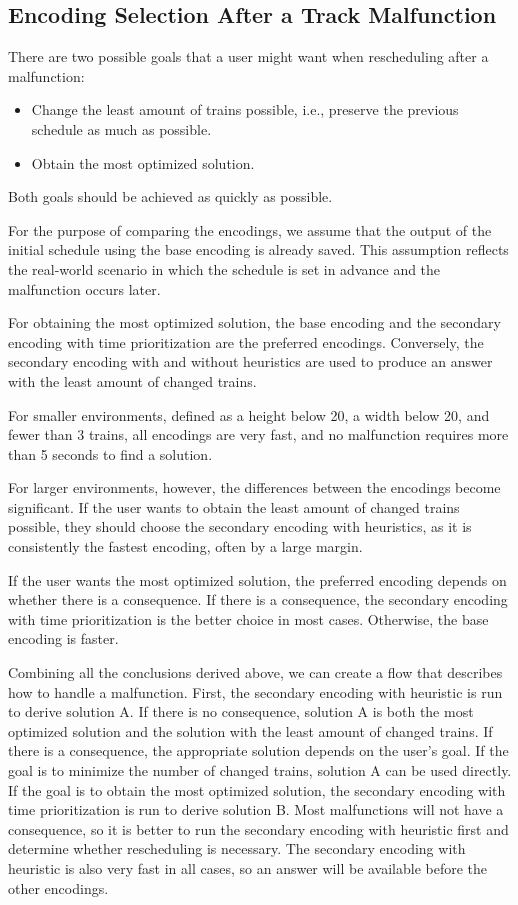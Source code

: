 \documentclass[runningheads]{llncs}
\begin{document}
\subsection{Encoding Selection After a Track Malfunction}

There are two possible goals that a user might want when rescheduling after
a malfunction:

\begin{itemize}
	\item Change the least amount of trains possible, i.e., preserve the
	previous schedule as much as possible.
	\item Obtain the most optimized solution.
\end{itemize}

Both goals should be achieved as quickly as possible.

For the purpose of comparing the encodings, we assume that the output of the
initial schedule using the base encoding is already saved. This assumption
reflects the real-world scenario in which the schedule is set in advance and
the malfunction occurs later.

For obtaining the most optimized solution, the base encoding and the
secondary encoding with time prioritization are the preferred encodings. Conversely, 
the secondary encoding with and without heuristics are used to produce 
an answer with the least amount of changed trains.

For smaller environments, defined as a height below 20, a
width below 20, and fewer than 3 trains, all encodings are very fast, and no
malfunction requires more than 5 seconds to find a solution.

For larger environments, however, the differences between the encodings become
significant. If the user wants to obtain the least amount of changed trains
possible, they should choose the secondary encoding with heuristics, as it is
consistently the fastest encoding, often by a large margin.

If the user wants the most optimized solution, the preferred encoding depends
on whether there is a consequence. If there is a consequence, the secondary
encoding with time prioritization is the better choice in most cases.
Otherwise, the base encoding is faster.

Combining all the conclusions derived above, we can create a flow that
describes how to handle a malfunction. First, the secondary encoding with heuristic is run
to derive solution A. If there is no consequence, solution A is both the most
optimized solution and the solution with the least amount of changed trains.
If there is a consequence, the appropriate solution depends on the user's
goal. If the goal is to minimize the number of changed trains, solution A can
be used directly. If the goal is to obtain the most optimized solution, the
secondary encoding with time prioritization is run to derive solution B.
Most malfunctions will not have a consequence, so it is better to run the
secondary encoding with heuristic first and determine whether rescheduling is necessary.
The secondary encoding with heuristic is also very fast in all cases, so an answer will be
available before the other encodings.
\end{document}

